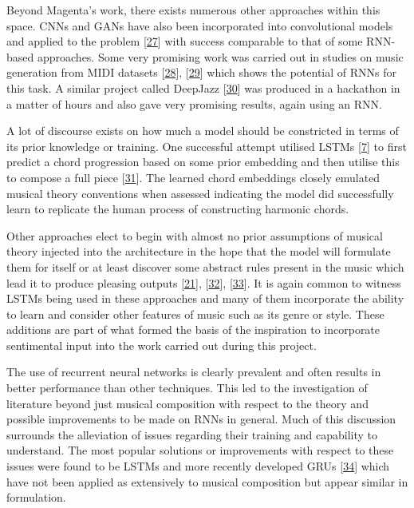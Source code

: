 \documentclass[12pt,]{article}
\begin{document}
Beyond Magenta's work, there exists numerous other approaches within
this space. CNNs and GANs have also been incorporated into convolutional
models and applied to the problem
{[}\protect\hyperlink{ref-yang2017midinet}{27}{]} with success
comparable to that of some RNN-based approaches. Some very promising
work was carried out in studies on music generation from MIDI datasets
{[}\protect\hyperlink{ref-hilschermusic}{28}{]},
{[}\protect\hyperlink{ref-wyse2018real}{29}{]} which shows the potential
of RNNs for this task. A similar project called DeepJazz
{[}\protect\hyperlink{ref-kim2016deepjazz}{30}{]} was produced in a
hackathon in a matter of hours and also gave very promising results,
again using an RNN.

A lot of discourse exists on how much a model should be constricted in
terms of its prior knowledge or training. One successful attempt
utilised LSTMs {[}\protect\hyperlink{ref-gers1999learning}{7}{]} to
first predict a chord progression based on some prior embedding and then
utilise this to compose a full piece
{[}\protect\hyperlink{ref-brunner2017jambot}{31}{]}. The learned chord
embeddings closely emulated musical theory conventions when assessed
indicating the model did successfully learn to replicate the human
process of constructing harmonic chords.

Other approaches elect to begin with almost no prior assumptions of
musical theory injected into the architecture in the hope that the model
will formulate them for itself or at least discover some abstract rules
present in the music which lead it to produce pleasing outputs
{[}\protect\hyperlink{ref-boulanger2012modeling}{21}{]},
{[}\protect\hyperlink{ref-kotecha2018generating}{32}{]},
{[}\protect\hyperlink{ref-colombo2018bachprop}{33}{]}. It is again
common to witness LSTMs being used in these approaches and many of them
incorporate the ability to learn and consider other features of music
such as its genre or style. These additions are part of what formed the
basis of the inspiration to incorporate sentimental input into the work
carried out during this project.

The use of recurrent neural networks is clearly prevalent and often
results in better performance than other techniques. This led to the
investigation of literature beyond just musical composition with respect
to the theory and possible improvements to be made on RNNs in general.
Much of this discussion surrounds the alleviation of issues regarding
their training and capability to understand. The most popular solutions
or improvements with respect to these issues were found to be LSTMs and
more recently developed GRUs
{[}\protect\hyperlink{ref-cho2014learning}{34}{]} which have not been
applied as extensively to musical composition but appear similar in
formulation.
\end{document}
